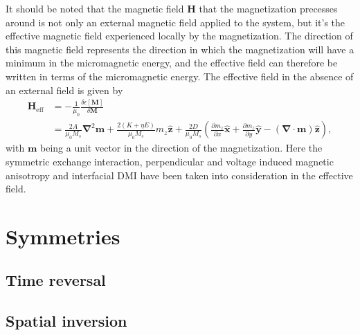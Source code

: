 \documentclass[12pt, a4paper, twoside, openright]{report}
\numberwithin{equation}{chapter}
\numberwithin{figure}{chapter}
\numberwithin{table}{chapter}
\begin{document}
It should be noted that the magnetic field $\mathbold{H}$ that the magnetization precesses around is not only an external magnetic field applied to the system, but it's the effective magnetic field experienced locally by the magnetization. The direction of this magnetic field represents the direction in which the magnetization will have a minimum in the micromagnetic energy, and the effective field can therefore be written in terms of the micromagnetic energy. The effective field in the absence of an external field is given by
\begin{align}
\label{eq:EffectiveField}
\nonumber\mathbold{H}_{\textrm{eff}} &= -\frac{1}{\mu_0}\frac{\delta\epsilon[\mathbold{M}]}{\delta\mathbold{M}} \\
&= \frac{2A}{\mu_0M_s}\mathbold{\nabla}^2\mathbold{m}+\frac{2(K+\eta E)}{\mu_0M_s}m_z\mathbold{\hat{z}} + \frac{2D}{\mu_0M_s}\left(\frac{\partial m_z}{\partial x}\mathbold{\hat{x}}+\frac{\partial m_z}{\partial y}\mathbold{\hat{y}}-(\mathbold{\nabla}\cdot\mathbold{m})\mathbold{\hat{z}}\right),
\end{align}
with $\mathbold{m}$ being a unit vector in the direction of the magnetization. Here the symmetric exchange interaction, perpendicular and voltage induced magnetic anisotropy and interfacial DMI have been taken into consideration in the effective field.
\section{Symmetries}
\subsection{Time reversal}
\subsection{Spatial inversion}
\end{document}

